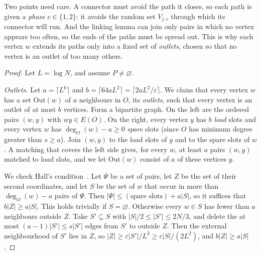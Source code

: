 \documentclass[11pt]{article}
\theoremstyle{definition}
\theoremstyle{remark}
\numberwithin{equation}{section}
\numberwithin{figure}{section}
\numberwithin{table}{section}
\newcommand{\eps}{\varepsilon}
\begin{document}
Two points need care. A connector must avoid the path it closes, so each path
is given a \emph{phase} $c\in\{1,2\}$: it avoids the random set $V_{j,c}$
through which its connector will run. And the linking lemma can join only
pairs in which no vertex appears too often, so the ends of the paths must be
spread out. This is why each vertex $w$ extends its paths only into a fixed set
of \emph{outlets}, chosen so that no vertex is an outlet of too many others.

\begin{proof}
Let $L=\log N$, and assume $P\ne\varnothing$.

\emph{Outlets.} Let $a=\lceil L^6\rceil$ and $b=\lceil64aL^2\rceil=\lceil
2aL^2/\eps\rceil$. We claim that every vertex $w$ has a set $\mathrm{Out}(w)$ of $a$
neighbours in $O$, its \emph{outlets}, such that every vertex is an outlet of
at most $b$ vertices. Form a bipartite graph. On the left are the ordered pairs
$(w,y)$ with $wy\in E(O)$. On the right, every vertex $y$ has $b$ \emph{load}
slots and every vertex $w$ has $\deg_O(w)-a\ge0$ \emph{spare} slots (since $O$ has minimum degree greater
than $s\ge a$). Join
$(w,y)$ to the load slots of $y$ and to the spare slots of $w$. A matching that
covers the left side gives, for every $w$, at least $a$ pairs $(w,y)$ matched to
load slots, and we let $\mathrm{Out}(w)$ consist of $a$ of these vertices $y$.

We check Hall's condition~\cite{Hal}. Let $\Psi$ be a set of pairs, let
$Z$ be the set of their second coordinates, and let $S$ be the set of $w$
that occur in more than $\deg_O(w)-a$ pairs of $\Psi$. Then
$|\Psi|\le(\text{spare slots})+a|S|$, so it suffices that $b|Z|\ge a|S|$.
This holds trivially if $S=\varnothing$. Otherwise every $w\in S$ has fewer
than $a$ neighbours outside $Z$. Take $S'\subseteq S$ with
$|S|/2\le|S'|\le2N/3$, and delete the at most $(a-1)|S'|\le s|S'|$ edges from
$S'$ to outside $Z$. Then the external neighbourhood of $S'$ lies in
$Z$, so $|Z|\ge\eps|S'|/L^2\ge\eps|S|/(2L^2)$, and $b|Z|\ge a|S|$.


\end{proof}
\end{document}
